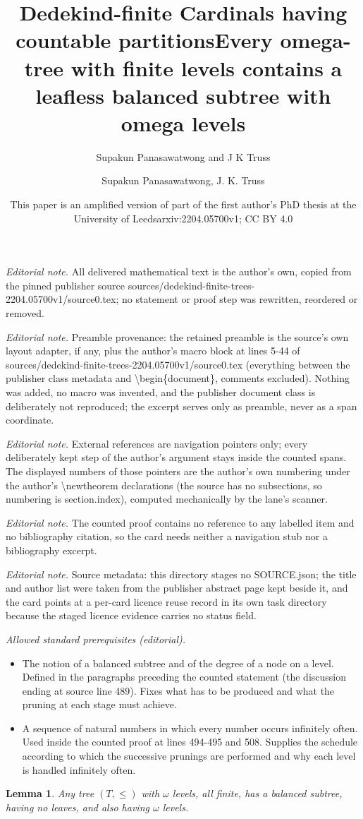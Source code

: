 \documentclass[10pt,a4paper]{amsart}
\title{Dedekind-finite Cardinals having countable partitions}
\author{Supakun Panasawatwong and J K Truss}
\date{This paper is an amplified version of part of the first author's PhD thesis at the University of Leeds}%
\title{Every omega-tree with finite levels contains a leafless balanced subtree with omega levels}
\author{Supakun Panasawatwong, J. K. Truss}
\date{arxiv:2204.05700v1; CC BY 4.0}
\newtheorem{lemma}[theorem]{Lemma}
\begin{document}
\maketitle
\noindent\textit{Editorial note.} All delivered mathematical text is the author's own, copied from the pinned publisher source sources/dedekind-finite-trees-2204.05700v1/source0.tex; no statement or proof step was rewritten, reordered or removed.\par\medskip
\noindent\textit{Editorial note.} Preamble provenance: the retained preamble is the source's own layout adapter, if any, plus the author's macro block at lines 5-44 of sources/dedekind-finite-trees-2204.05700v1/source0.tex (everything between the publisher class metadata and \textbackslash{}begin\{document\}, comments excluded). Nothing was added, no macro was invented, and the publisher document class is deliberately not reproduced; the excerpt serves only as preamble, never as a span coordinate.\par\medskip
\noindent\textit{Editorial note.} External references are navigation pointers only; every deliberately kept step of the author's argument stays inside the counted spans. The displayed numbers of those pointers are the author's own numbering under the author's \textbackslash{}newtheorem declarations (the source has no subsections, so numbering is section.index), computed mechanically by the lane's scanner.\par\medskip
\noindent\textit{Editorial note.} The counted proof contains no reference to any labelled item and no bibliography citation, so the card needs neither a navigation stub nor a bibliography excerpt.\par\medskip
\noindent\textit{Editorial note.} Source metadata: this directory stages no SOURCE.json; the title and author list were taken from the publisher abstract page kept beside it, and the card points at a per-card licence reuse record in its own task directory because the staged licence evidence carries no status field.\par\medskip
\noindent\textit{Allowed standard prerequisites (editorial).}\begin{itemize}
\item The notion of a balanced subtree and of the degree of a node on a level. Defined in the paragraphs preceding the counted statement (the discussion ending at source line 489). Fixes what has to be produced and what the pruning at each stage must achieve.
\item A sequence of natural numbers in which every number occurs infinitely often. Used inside the counted proof at lines 494-495 and 508. Supplies the schedule according to which the successive prunings are performed and why each level is handled infinitely often.
\end{itemize}\medskip
\begin{lemma} Any tree $(T, \le)$ with $\omega$ levels, all finite, has a balanced subtree, having no leaves,
and also having $\omega$ levels. \label{4.1}  \end{lemma}
\end{document}
